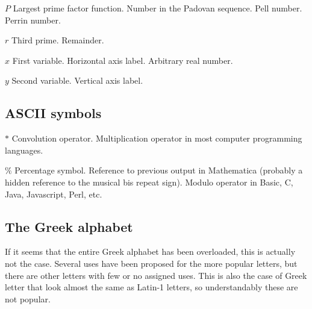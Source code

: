 \documentclass[12pt]{article}
\begin{document}


$P$ Largest prime factor function. Number in the Padovan sequence. Pell number. Perrin number.





$r$ Third prime. Remainder.









$x$ First variable. Horizontal axis label. Arbitrary real number.


$y$ Second variable. Vertical axis label.



\subsection{ASCII symbols}

$\ast$ Convolution operator. Multiplication operator in most computer programming languages.

$\%$ Percentage symbol. Reference to previous output in Mathematica (probably a hidden reference to the musical bis repeat sign). Modulo operator in Basic, C, Java, Javascript, Perl, etc.

\subsection{The Greek alphabet}

If it seems that the entire Greek alphabet has been overloaded, this is actually not the case. Several uses have been proposed for the more popular letters, but there are other letters with few or no assigned uses. This is also the case of Greek letter that look almost the same as Latin-1 letters, so understandably these are not popular.
\end{document}
